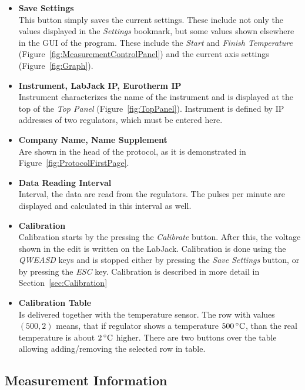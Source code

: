 \documentclass[a4paper,11pt,twoside]{book}
\theoremstyle{named}
\begin{document}
\begin{itemize}
  \item \textbf{Save Settings} \\
    This button simply saves the current settings. These include not only the
    values displayed in the \textit{Settings} bookmark, but some values shown
    elsewhere in the GUI of the program. These include the \textit{Start} and
    \textit{Finish Temperature} (Figure~\ref{fig:MeasurementControlPanel}) and
    the current axis settings (Figure~\ref{fig:Graph}).
  \item \textbf{Instrument, LabJack IP, Eurotherm IP} \\
    Instrument characterizes the name of the instrument and is displayed at the
    top of the \textit{Top Panel} (Figure~\ref{fig:TopPanel}). Instrument is defined by
    IP addresses of two regulators, which must be entered here.
  \item \textbf{Company Name, Name Supplement} \\
    Are shown in the head of the protocol, as it is demonstrated in 
    Figure~\ref{fig:ProtocolFirstPage}.
  \item \textbf{Data Reading Interval} \\
    Interval, the data are read from the regulators. The pulses per minute are
    displayed and calculated in this interval as well. 
  \item \textbf{Calibration} \\
    Calibration starts by the pressing the \textit{Calibrate} button. After
    this, the voltage shown in the edit is written on the LabJack. Calibration
    is done using the \textit{QWEASD} keys and is stopped either by pressing the
    \textit{Save Settings} button, or by pressing the \textit{ESC} key.
    Calibration is described in more detail in Section~\ref{sec:Calibration}
  \item \textbf{Calibration Table} \\
    Is delivered together with the temperature sensor. The row with values
    $(500,2)$ means, that if regulator shows a temperature $500\,^{\circ}{\rm
    C}$, than the real temperature is about $2\,^{\circ}{\rm C}$ higher. There
    are two buttons over the table allowing adding/removing the selected row in
    table.
\end{itemize}

\subsection{Measurement Information}
\label{sec:MeasurementInformation}
\end{document}
